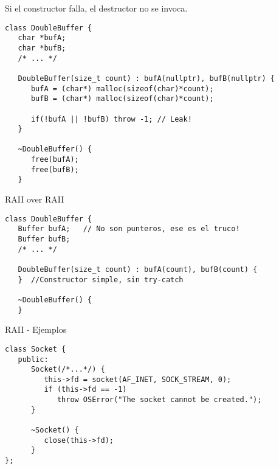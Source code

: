 \begin{frame}[fragile]{Si el constructor falla, el destructor no se invoca.}
   \begin{lstlisting}[style=normal]
class DoubleBuffer {
   char *bufA;
   char *bufB;
   /* ... */

   DoubleBuffer(size_t count) : bufA(nullptr), bufB(nullptr) {
      bufA = (char*) malloc(sizeof(char)*count);
      bufB = (char*) malloc(sizeof(char)*count);

      if(!bufA || !bufB) throw -1; // Leak!
   }

   ~DoubleBuffer() {
      free(bufA);
      free(bufB);
   }
   \end{lstlisting}
\end{frame}

\begin{frame}[fragile]{RAII over RAII}{}
   \begin{lstlisting}[style=normal]
class DoubleBuffer {
   Buffer bufA;   // No son punteros, ese es el truco!
   Buffer bufB;
   /* ... */

   DoubleBuffer(size_t count) : bufA(count), bufB(count) {
   }  //Constructor simple, sin try-catch

   ~DoubleBuffer() {
   }
   \end{lstlisting}
\end{frame}

\begin{frame}[fragile]{RAII - Ejemplos}
   \begin{lstlisting}[style=normal]
class Socket {
   public:
      Socket(/*...*/) {
         this->fd = socket(AF_INET, SOCK_STREAM, 0);
         if (this->fd == -1)
            throw OSError("The socket cannot be created.");
      }

      ~Socket() {
         close(this->fd);
      }
};
   \end{lstlisting}
\end{frame}

